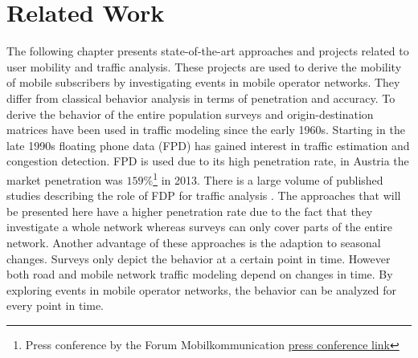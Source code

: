 \documentclass[master,english]{hgbthesis}
\begin{document}
\chapter{Related Work}
The following chapter presents state-of-the-art approaches and projects related to user mobility and traffic analysis. These projects are used to derive the mobility of mobile subscribers by investigating events in mobile operator networks. They differ from classical behavior analysis in terms of penetration and accuracy. To derive the behavior of the entire population surveys and origin-destination matrices have been used in traffic modeling since the early 1960s.
Starting in the late 1990s floating phone data (FPD) has gained interest in traffic estimation and congestion detection. FPD is used due to its high penetration rate, in Austria the market penetration was $159\%$\footnote{Press conference by the Forum Mobilkommunication \href{http://www.fmk.at/Medien/Pressekonferenzen/FMK-Jahrespressekonferenz-2012}{press conference link}} in 2013. There is a large volume of published studies describing the role of FDP for traffic analysis \cite{Yim2001,Qiu2007,Caceres2008}.
The approaches that will be presented here have a higher penetration rate due to the fact that they investigate a whole network whereas surveys can only cover parts of the entire network. Another advantage of these approaches is the adaption to seasonal changes. Surveys only depict the behavior at a certain point in time. However both road and mobile network traffic modeling depend on changes in time. By exploring events in mobile operator networks, the behavior can be analyzed for every point in time.
\end{document}
